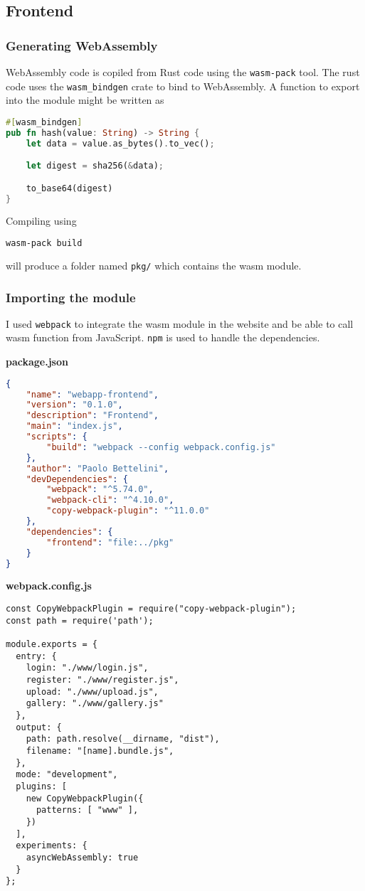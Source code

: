 \documentclass[../documentation.tex]{subfiles}
\begin{document}
\subsection{Frontend}

\subsubsection{Generating WebAssembly}

WebAssembly code is copiled from Rust code using the \texttt{wasm-pack} tool.
The rust code uses the \texttt{wasm\_bindgen} crate to bind to WebAssembly.
A function to export into the module might be written as

\begin{lstlisting}[language=Rust]
#[wasm_bindgen]
pub fn hash(value: String) -> String {
    let data = value.as_bytes().to_vec();

    let digest = sha256(&data);

    to_base64(digest)
}
\end{lstlisting}

Compiling using
\begin{lstlisting}[language=bash]
    wasm-pack build
\end{lstlisting}
will produce a folder named \texttt{pkg/} which contains the wasm module.

\subsubsection{Importing the module}

I used \texttt{webpack} to integrate the wasm module in the website
and be able to call wasm function from JavaScript.
\texttt{npm} is used to handle the dependencies.

\textbf{package.json}
\begin{lstlisting}[language=json]
{
    "name": "webapp-frontend",
    "version": "0.1.0",
    "description": "Frontend",
    "main": "index.js",
    "scripts": {
        "build": "webpack --config webpack.config.js"
    },
    "author": "Paolo Bettelini",
    "devDependencies": {
        "webpack": "^5.74.0",
        "webpack-cli": "^4.10.0",
        "copy-webpack-plugin": "^11.0.0"
    },
    "dependencies": {
        "frontend": "file:../pkg"
    }
}
\end{lstlisting}

\textbf{webpack.config.js}
\begin{lstlisting}[style=js]
const CopyWebpackPlugin = require("copy-webpack-plugin");
const path = require('path');

module.exports = {
  entry: {
    login: "./www/login.js",
    register: "./www/register.js",
    upload: "./www/upload.js",
    gallery: "./www/gallery.js"
  },
  output: {
    path: path.resolve(__dirname, "dist"),
    filename: "[name].bundle.js",
  },
  mode: "development",
  plugins: [
    new CopyWebpackPlugin({
      patterns: [ "www" ],
    })
  ],
  experiments: {
    asyncWebAssembly: true
  }
};
\end{lstlisting}
\end{document}
